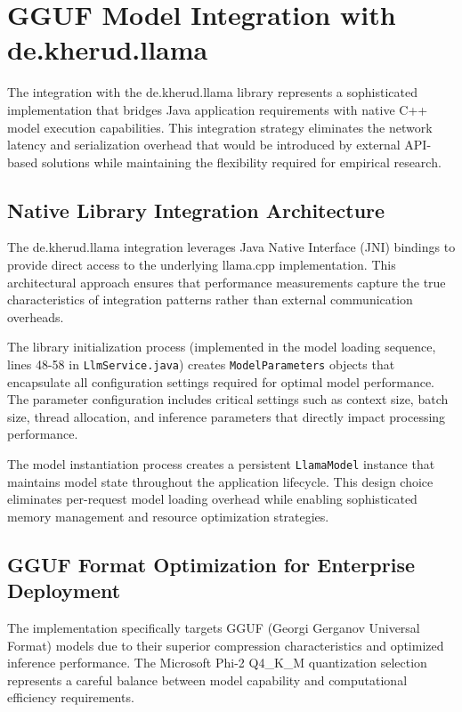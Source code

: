 \section{GGUF Model Integration with de.kherud.llama}

The integration with the de.kherud.llama library represents a sophisticated implementation that bridges Java application requirements with native C++ model execution capabilities. This integration strategy eliminates the network latency and serialization overhead that would be introduced by external API-based solutions while maintaining the flexibility required for empirical research.

\subsection{Native Library Integration Architecture}

The de.kherud.llama integration leverages Java Native Interface (JNI) bindings to provide direct access to the underlying llama.cpp implementation. This architectural approach ensures that performance measurements capture the true characteristics of integration patterns rather than external communication overheads.

The library initialization process (implemented in the model loading sequence, lines 48-58 in \texttt{LlmService.java}) creates \texttt{ModelParameters} objects that encapsulate all configuration settings required for optimal model performance. The parameter configuration includes critical settings such as context size, batch size, thread allocation, and inference parameters that directly impact processing performance.


The model instantiation process creates a persistent \texttt{LlamaModel} instance that maintains model state throughout the application lifecycle. This design choice eliminates per-request model loading overhead while enabling sophisticated memory management and resource optimization strategies.

\subsection{GGUF Format Optimization for Enterprise Deployment}

The implementation specifically targets GGUF (Georgi Gerganov Universal Format) models due to their superior compression characteristics and optimized inference performance. The Microsoft Phi-2 Q4\_K\_M quantization selection represents a careful balance between model capability and computational efficiency requirements.

